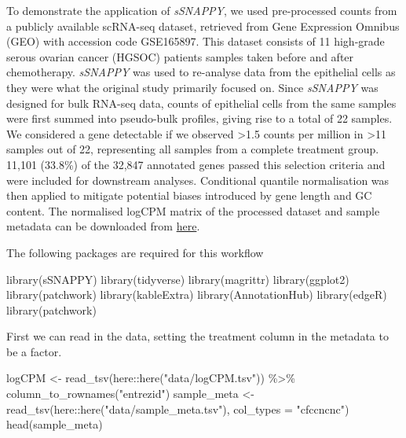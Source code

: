\documentclass[9pt,a4paper,]{extarticle}
\newenvironment{Shaded}{\begin{snugshade}}{\end{snugshade}}
\newcommand{\AttributeTok}[1]{\textcolor[rgb]{0.77,0.63,0.00}{#1}}
\newcommand{\FunctionTok}[1]{\textcolor[rgb]{0.00,0.00,0.00}{#1}}
\newcommand{\NormalTok}[1]{#1}
\newcommand{\OtherTok}[1]{\textcolor[rgb]{0.56,0.35,0.01}{#1}}
\newcommand{\SpecialCharTok}[1]{\textcolor[rgb]{0.00,0.00,0.00}{#1}}
\newcommand{\StringTok}[1]{\textcolor[rgb]{0.31,0.60,0.02}{#1}}
\begin{document}
To demonstrate the application of \emph{sSNAPPY}, we used pre-processed counts from a publicly available scRNA-seq dataset, retrieved from Gene Expression Omnibus (GEO) with accession code GSE165897.
This dataset consists of 11 high-grade serous ovarian cancer (HGSOC) patients samples taken before and after chemotherapy\citep{Zhang2022}.
\emph{sSNAPPY} was used to re-analyse data from the epithelial cells as they were what the original study primarily focused on.
Since \emph{sSNAPPY} was designed for bulk RNA-seq data, counts of epithelial cells from the same samples were first summed into pseudo-bulk profiles, giving rise to a total of 22 samples.
We considered a gene detectable if we observed \textgreater1.5 counts per million in \textgreater11 samples out of 22, representing all samples from a complete treatment group.
11,101 (33.8\%) of the 32,847 annotated genes passed this selection criteria and were included for downstream analyses.
Conditional quantile normalisation\citep{Hansen2012} was then applied to mitigate potential biases introduced by gene length and GC content.
The normalised logCPM matrix of the processed dataset and sample metadata can be downloaded from \href{https://github.com/Wenjun-Liu/F1000_sSNAPPY_manuscript/tree/master/data}{here}.

The following packages are required for this workflow

\begin{Shaded}
\begin{Highlighting}[]
\FunctionTok{library}\NormalTok{(sSNAPPY)}
\FunctionTok{library}\NormalTok{(tidyverse)}
\FunctionTok{library}\NormalTok{(magrittr)}
\FunctionTok{library}\NormalTok{(ggplot2)}
\FunctionTok{library}\NormalTok{(patchwork)}
\FunctionTok{library}\NormalTok{(kableExtra)}
\FunctionTok{library}\NormalTok{(AnnotationHub) }
\FunctionTok{library}\NormalTok{(edgeR)}
\FunctionTok{library}\NormalTok{(patchwork)}
\end{Highlighting}
\end{Shaded}

First we can read in the data, setting the treatment column in the metadata to be a factor.

\begin{Shaded}
\begin{Highlighting}[]
\NormalTok{logCPM }\OtherTok{\textless{}{-}} \FunctionTok{read\_tsv}\NormalTok{(here}\SpecialCharTok{::}\FunctionTok{here}\NormalTok{(}\StringTok{"data/logCPM.tsv"}\NormalTok{)) }\SpecialCharTok{\%\textgreater{}\%}
    \FunctionTok{column\_to\_rownames}\NormalTok{(}\StringTok{"entrezid"}\NormalTok{)}
\NormalTok{sample\_meta }\OtherTok{\textless{}{-}} \FunctionTok{read\_tsv}\NormalTok{(here}\SpecialCharTok{::}\FunctionTok{here}\NormalTok{(}\StringTok{"data/sample\_meta.tsv"}\NormalTok{), }\AttributeTok{col\_types =} \StringTok{"cfccncnc"}\NormalTok{)}
\FunctionTok{head}\NormalTok{(sample\_meta)}
\end{Highlighting}
\end{Shaded}
\end{document}
